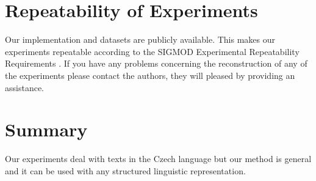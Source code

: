 \section{Repeatability of Experiments} \label{sec:conclusion_repeatablity}

Our implementation and datasets are publicly available. This makes our experiments repeatable according to the
SIGMOD Experimental Repeatability Requirements \citep{biblio:SIGMODrepeatability}. If you have any problems concerning the reconstruction of any of the experiments please contact the authors, they will pleased by providing an assistance. 



\section{Summary}

Our experiments deal with texts in the Czech language but our method is general and it can be used with any structured linguistic representation. 
